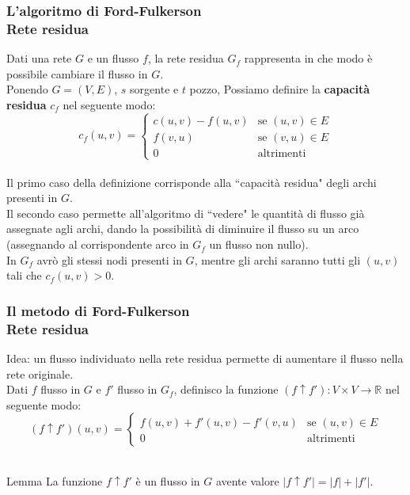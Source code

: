 \documentclass{beamer}
\begin{document}
\begin{frame}
\frametitle{L'algoritmo di Ford-Fulkerson\\Rete residua}
Dati una rete $G$ e un flusso $f$, la rete residua $G_f$ rappresenta in che modo è possibile cambiare il flusso in $G$.\\
Ponendo $G=(V,E)$, $s$ sorgente e $t$ pozzo, Possiamo definire la \textbf{capacità residua} $c_f$ nel seguente modo:\\
$$c_f(u,v) =
\left\{
	\begin{array}{ll}
		c(u,v)-f(u,v)  & \mbox{se } (u,v)\in E \\
		f(v,u) & \mbox{se } (v,u)\in E \\
		0 & \mbox{altrimenti}
	\end{array}
\right.$$\\
Il primo caso della definizione corrisponde alla ``capacità residua" degli archi presenti in $G$.\\
Il secondo caso permette all'algoritmo di ``vedere" le quantità di flusso già assegnate agli archi, dando la possibilità di diminuire il flusso su un arco (assegnando al corrispondente arco in $G_f$ un flusso non nullo).\\
In $G_f$ avrò gli stessi nodi presenti in $G$, mentre gli archi saranno tutti gli $(u,v)$ tali che $c_f(u,v)>0$.
\end{frame}

\begin{frame}
\frametitle{Il metodo di Ford-Fulkerson\\Rete residua}
Idea: un flusso individuato nella rete residua permette di aumentare il flusso nella rete originale.\\
Dati $f$ flusso in $G$ e $f'$ flusso in $G_f$, definisco la funzione $(f\uparrow f'):V\times V\rightarrow \mathbb{R}$ nel seguente modo:\\
$$(f\uparrow f')(u,v) =
\left\{
	\begin{array}{ll}
		f(u,v)+f'(u,v)-f'(v,u) & \mbox{se } (u,v)\in E \\
		0 & \mbox{altrimenti}
	\end{array}
\right.$$\\
\begin{block}{Lemma}
La funzione $f\uparrow f'$ è un flusso in $G$ avente valore $|f\uparrow f'|=|f|+|f'|$.
\end{block}
\end{frame}
\end{document}
